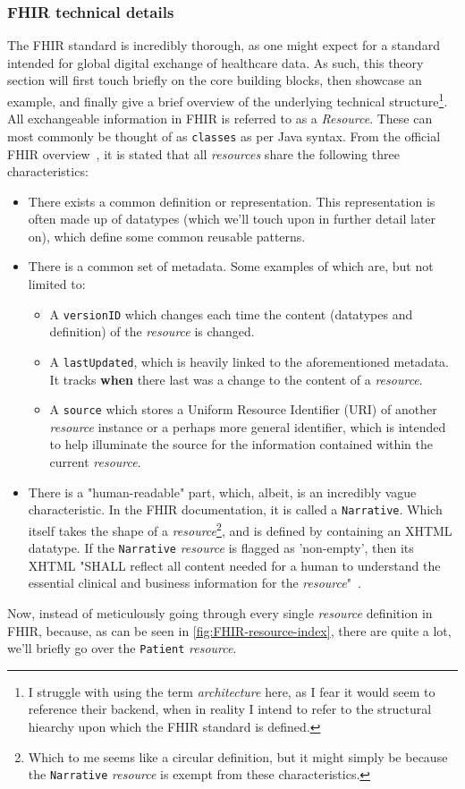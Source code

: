 \subsubsection*{FHIR technical details}
The FHIR standard is incredibly thorough, as one might expect for a standard intended for global digital exchange of healthcare data. As such, this theory section will first touch briefly on the core building blocks, then showcase an example, and finally give a brief overview of the underlying technical structure\footnote{I struggle with using the term \emph{architecture} here, as I fear it would seem to reference their backend, when in reality I intend to refer to the structural hiearchy upon which the FHIR standard is defined.}.
\\ 
All exchangeable information in FHIR is referred to as a \emph{Resource}. These can most commonly be thought of as \texttt{classes} as per Java syntax. From the official FHIR overview~\cite{FHIR-overview}, it is stated that all \emph{resources} share the following three characteristics:
\begin{itemize}
	\item There exists a common definition or representation. This representation is often made up of datatypes (which we'll touch upon in further detail later on), which define some common reusable patterns.
	\item There is a common set of metadata. Some examples of which are, but not limited to:
	\begin{itemize}
		\item A \texttt{versionID} which changes each time the content (datatypes and definition) of the \emph{resource} is changed.
		\item  A \texttt{lastUpdated}, which is heavily linked to the aforementioned metadata. It tracks \textbf{when} there last was a change to the content of a \emph{resource}.
		\item A \texttt{source} which stores a Uniform Resource Identifier (URI) of another \emph{resource} instance or a perhaps more general identifier, which is intended to help illuminate the source for the information contained within the current \emph{resource}. 
	\end{itemize}
	\item There is a "human-readable" part, which, albeit, is an incredibly vague characteristic. In the FHIR documentation, it is called a \texttt{Narrative}. Which itself takes the shape of a \emph{resource}\footnote{Which to me seems like a circular definition, but it might simply be because the \texttt{Narrative} \emph{resource} is exempt from these characteristics.}, and is defined by containing an XHTML datatype. If the \texttt{Narrative} \emph{resource} is flagged as 'non-empty', then its XHTML "SHALL reflect all content needed for a human to understand the essential clinical and business information for the \emph{resource}"~\cite{FHIR-Narrative}.
\end{itemize}
\noindent
Now, instead of meticulously going through every single \emph{resource} definition in FHIR, because, as can be seen in \autoref{fig:FHIR-resource-index}, there are quite a lot, we'll briefly go over the \texttt{Patient} \emph{resource}.

